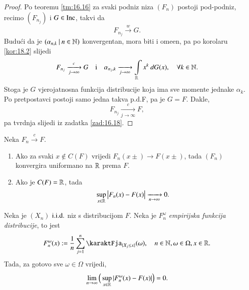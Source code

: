\begin{proof}
    Po teoremu \ref{tm:16.16} za svaki podniz niza $(F_n)$ postoji pod-podniz, recimo $(F_{n_j})$ i $G \in \mathrm{Inc}$, takvi da
    \begin{equation*}
        F_{n_j} \xrightarrow{w} G.
    \end{equation*}
    Budu\' ci da je $({\alpha_{n, k}} \: | \: {n \in \mathbb{N}})$ konvergentan, mora biti i ome\dj en, pa po korolaru \ref{kor:18.2} slijedi
    \begin{equation*}
        F_{n_j} \xrightarrow[j \to \infty]{c} G \quad \textnormal{i} \quad \alpha_{n_j, k} \xrightarrow[j \to \infty]{} \int\limits_{\mathbb{R}} x^k \: d G (x), \quad \forall k \in \mathbb{N}.
    \end{equation*}
    Stoga je $G$ vjerojatnosna funkcija distribucije koja ima sve momente jednake $\alpha_k$.
    Po pretpostavci postoji samo jedna takva p.d.F, pa je $G = F$.
    Dakle,
    \begin{equation*}
        F_{n_j} \xrightarrow[j \to \infty]{c} F,
    \end{equation*}
    pa tvrdnja slijedi iz zadatka \ref{zad:16.18}.
\end{proof}

\begin{zad}  \label{zad:18.4}
    Neka $F_n \xrightarrow{c} F$.
    \begin{enumerate}[label=(\roman*)]
        \item   \label{zad:18.4.1}
        Ako za svaki $x \notin C(F)$ vrijedi $F_n (x \pm) \to F (x \pm)$, tada $(F_n)$ konvergira uniformano na $\mathbb{R}$ prema $F$.
        \item   \label{zad:18.4.2}
        Ako je $C(F) = \mathbb{R}$, tada
        \begin{equation*}
            \sup\limits_{x \in \mathbb{R}} \big| F_n (x) - F(x) \big| \xrightarrow[n \to \infty]{} 0.
        \end{equation*}
    \end{enumerate}
\end{zad}

\begin{tm}   \label{tm:18.5}
    Neka je $(X_n)$ $\mathrm{i.i.d.}$ niz s distribucijom $F$.
    Neka je $F^\omega_n$ \emph{empirijska funkcija distribucije}, to jest
    \begin{equation*}
        F^\omega_n (x) := \frac{1}{n} \suma{j = 1}{n} \karaktFja_{\{ X_j \leq x \}}(\omega), \quad n \in \nat, \omega \in \Omega, x \in \real.
    \end{equation*}
    Tada, za gotovo sve $\omega \in \Omega$ vrijedi,
    \begin{equation*}
        \lim\limits_{n \to \infty} \Big( \sup\limits_{x \in \mathbb{R}} | F^\omega_n(x) - F(x) | \Big) = 0.
    \end{equation*}
\end{tm}

